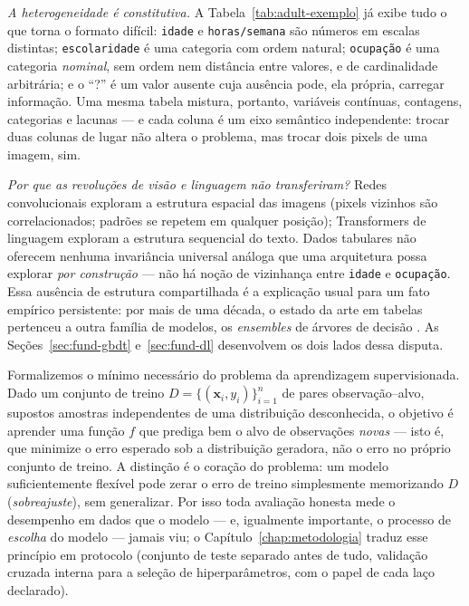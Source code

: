 \emph{A heterogeneidade é constitutiva.} A Tabela~\ref{tab:adult-exemplo}
já exibe tudo o que torna o formato difícil: \texttt{idade} e
\texttt{horas/semana} são números em escalas distintas;
\texttt{escolaridade} é uma categoria com ordem natural;
\texttt{ocupação} é uma categoria \emph{nominal}, sem ordem nem distância
entre valores, e de cardinalidade arbitrária; e o ``?'' é um valor ausente
cuja ausência pode, ela própria, carregar informação. Uma mesma tabela
mistura, portanto, variáveis contínuas, contagens, categorias e lacunas ---
e cada coluna é um eixo semântico independente: trocar duas colunas de
lugar não altera o problema, mas trocar dois pixels de uma imagem, sim.

\emph{Por que as revoluções de visão e linguagem não transferiram?}
Redes convolucionais exploram a estrutura espacial das imagens (pixels
vizinhos são correlacionados; padrões se repetem em qualquer posição);
Transformers de linguagem exploram a estrutura sequencial do texto. Dados
tabulares não oferecem nenhuma invariância universal análoga que uma
arquitetura possa explorar \emph{por construção} --- não há noção de
vizinhança entre \texttt{idade} e \texttt{ocupação}. Essa ausência de
estrutura compartilhada é a explicação usual para um fato empírico
persistente: por mais de uma década, o estado da arte em tabelas pertenceu
a outra família de modelos, os \emph{ensembles} de árvores de decisão
\citep{grinsztajn2022}. As Seções~\ref{sec:fund-gbdt}
e~\ref{sec:fund-dl} desenvolvem os dois lados dessa disputa.

Formalizemos o mínimo necessário do problema da aprendizagem
supervisionada. Dado um conjunto de treino
$D = \{(\mathbf{x}_i, y_i)\}_{i=1}^{n}$ de pares observação--alvo,
supostos amostras independentes de uma distribuição desconhecida, o
objetivo é aprender uma função $f$ que prediga bem o alvo de observações
\emph{novas} --- isto é, que minimize o erro esperado sob a distribuição
geradora, não o erro no próprio conjunto de treino. A distinção é o coração
do problema: um modelo suficientemente flexível pode zerar o erro de treino
simplesmente memorizando $D$ (\emph{sobreajuste}), sem generalizar. Por
isso toda avaliação honesta mede o desempenho em dados que o modelo --- e,
igualmente importante, o processo de \emph{escolha} do modelo --- jamais
viu; o Capítulo~\ref{chap:metodologia} traduz esse princípio em protocolo (conjunto de teste
separado antes de tudo, validação cruzada interna para a seleção de
hiperparâmetros, com o papel de cada laço declarado).

